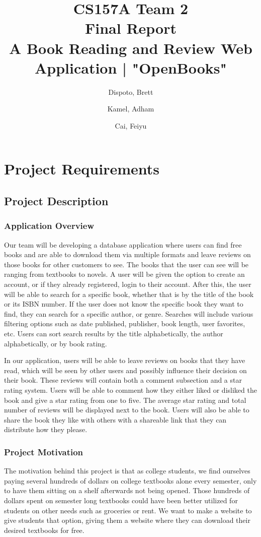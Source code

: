 \documentclass[letter, 12pt, titlepage]{article}
\author{
	Dispoto, Brett\\
        \and
        Kamel, Adham\\
        \and
        Cai, Feiyu\\
}
\title{CS157A Team 2 \\ Final Report\\
        \large A Book Reading and Review Web Application | "OpenBooks"}
\begin{document}
\maketitle
\tableofcontents
\newpage
\section{Project Requirements}
\subsection{Project Description}
\subsubsection{Application Overview}
Our team will be developing a database application where users can find free books and are able to download them via multiple formats and leave reviews on those books for other customers to see. The books that the user can see will be ranging from textbooks to novels. A user will be given the option to create an account, or if they already registered, login to their account. After this, the user will be able to search for a specific book, whether that is by the title of the book or its ISBN number. If the user does not know the specific book they want to find, they can search for a specific author, or genre. Searches will include various filtering options such as date published, publisher, book length, user favorites, etc. Users can sort search results by the title alphabetically, the author alphabetically, or by book rating.

\medskip
In our application, users will be able to leave reviews on books that they have read, which will be seen by other users and possibly influence their decision on their book. These reviews will contain both a comment subsection and a star rating system. Users will be able to comment how they either liked or disliked the book and give a star rating from one to five. The average star rating and total number of reviews will be displayed next to the book. Users will also be able to share the book they like with others with a shareable link that they can distribute how they please.
\subsubsection{Project Motivation}
The motivation behind this project is that as college students, we find ourselves paying several hundreds of dollars on college textbooks alone every semester, only to have them sitting on a shelf afterwards not being opened. Those hundreds of dollars spent on semester long textbooks could have been better utilized for students on other needs such as groceries or rent. We want to make a website to give students that option, giving them a website where they can download their desired textbooks for free.
\end{document}
